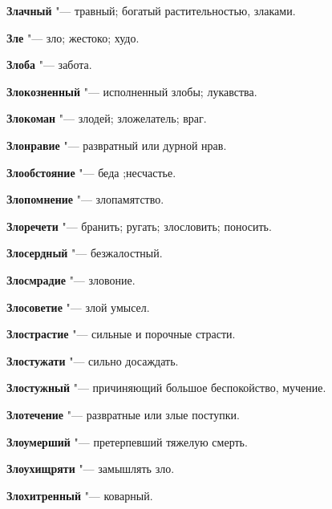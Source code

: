 \begin{mymulticols}{2}
\noindent\textbf{Злачный} "--- травный; богатый растительностью, злаками. 




\noindent\textbf{Зле} "--- зло; жестоко; худо. 




\noindent\textbf{Злоба} "--- забота. 




\noindent\textbf{Злокозненный} "--- исполненный злобы; лукавства. 




\noindent\textbf{Злокоман} "--- злодей; зложелатель; враг. 




\noindent\textbf{Злонравие} "--- развратный или дурной нрав. 




\noindent\textbf{Злообстояние} "--- беда ;несчастье. 




\noindent\textbf{Злопомнение} "--- злопамятство. 




\noindent\textbf{Злоречети} "--- бранить; ругать; злословить; поносить. 




\noindent\textbf{Злосердный} "--- безжалостный. 




\noindent\textbf{Злосмрадие} "--- зловоние. 




\noindent\textbf{Злосоветие} "--- злой умысел. 




\noindent\textbf{Злострастие} "--- сильные и порочные страсти. 




\noindent\textbf{Злостужати} "--- сильно досаждать. 




\noindent\textbf{Злостужный} "--- причиняющий большое беспокойство, мучение. 




\noindent\textbf{Злотечение} "--- развратные или злые поступки. 




\noindent\textbf{Злоумерший} "--- претерпевший тяжелую смерть. 




\noindent\textbf{Злоухищряти} "--- замышлять зло. 




\noindent\textbf{Злохитренный} "--- коварный. 





\end{mymulticols}
